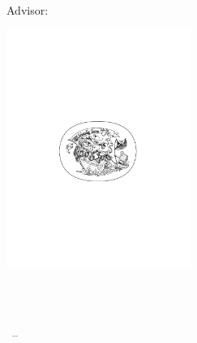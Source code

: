 \begin{titlepage}
    \begin{addmargin}[-1cm]{-3cm}
    \begin{center}
        \large

        \hfill

        \vfill

        \begingroup
            \color{Maroon}\spacedallcaps{\myTitle} \\ \bigskip
        \endgroup

        \spacedlowsmallcaps{\myName}

        \medskip

        {\small Advisor: \myProf}

        \vfill

        \includegraphics[width=6cm]{gfx/TFZsuperellipse_bw} \\ \medskip

        \myDegree \\
        \myUni \\ \bigskip

        \myTime\ -- \myVersion

        \vfill

    \end{center}
  \end{addmargin}
\end{titlepage}
